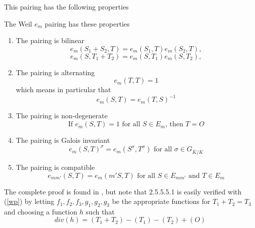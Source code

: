This pairing has the following properties
\begin{thm}
	The Weil $e_m$ pairing has these properties
	\begin{enumerate}
		\item The pairing is bilinear
		\begin{equation*}
		e_m(S_1+S_2,T)=e_m(S_1,T)e_m(S_2,T),
		\end{equation*}
		\begin{equation*}
		e_m(S,T_1+T_2)=e_m(S,T_1)e_m(S,T_2),
		\end{equation*}
		\item The pairing is alternating
		\begin{equation*}
		e_m(T,T)=1
		\end{equation*}
		which means in particular that
		\begin{equation*}
		e_m(S,T)=e_m(T,S)^{-1}
		\end{equation*}
		\item The pairing is non-degenerate
		\begin{equation*}
		\text{If } e_m(S,T)=1\text{ for all } S\in E_m\text{, then } T=O
		\end{equation*}
		\item The pairing is Galois invariant
		\begin{equation*}
		e_m(S,T)^\sigma=e_m(S^\sigma,T^\sigma)\text{ for all }\sigma\in G_{\bar{K}/K}
		\end{equation*}
		\item The pairing is compatible
		\begin{equation*}
		e_{mm'}(S,T)=e_m(m'S,T)\text{ for all }S\in E_{mm'}\text{ and }T\in E_m
		\end{equation*}
	\end{enumerate}
\end{thm}

\begin{prf}
	The complete proof is found in \cite[page 96]{EllipticCurvesBook}, but note that 2.5.5.5.1 is easily verified with (\ref{wp}) by letting $f_1,f_2,f_3,g_1,g_2,g_3$ be the appropriate functions for $T_1+T_2=T_3$ and choosing a function $h$ such that
	\begin{equation*}
	div(h)=(T_1+T_2)-(T_1)-(T_2)+(O)
	\end{equation*}
\end{prf}

